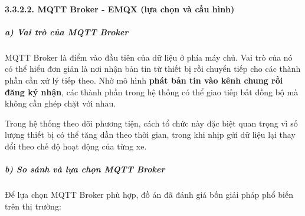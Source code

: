 \documentclass[a4paper]{extarticle}
\begin{document}
\paragraph{3.3.2.2. MQTT Broker - EMQX (lựa chọn và cấu hình)}\label{3232-mqtt-broker---emqx-message-broker-selection--configuration}

\subparagraph{a) Vai trò của MQTT
Broker}\label{a-vai-truxf2-cux1ee7a-mqtt-broker}

MQTT Broker là điểm vào đầu tiên của dữ liệu ở phía máy chủ. Vai trò của
nó có thể hiểu đơn giản là nơi nhận bản tin từ thiết bị rồi chuyển tiếp
cho các thành phần cần xử lý tiếp theo. Nhờ mô hình \textbf{phát bản tin vào kênh chung rồi đăng ký nhận},
các thành phần trong hệ thống có thể giao tiếp bất đồng bộ mà không cần
ghép chặt với nhau.

Trong hệ thống theo dõi phương tiện, cách tổ chức này đặc biệt quan
trọng vì số lượng thiết bị có thể tăng dần theo thời gian, trong khi
nhịp gửi dữ liệu lại thay đổi theo chế độ hoạt động của từng xe.

\subparagraph{b) So sánh và lựa chọn MQTT
Broker}\label{b-so-suxe1nh-vuxe0-lux1ef1a-chux1ecdn-mqtt-broker}

Để lựa chọn MQTT Broker phù hợp, đồ án đã đánh giá bốn giải pháp phổ
biến trên thị trường:
\end{document}
